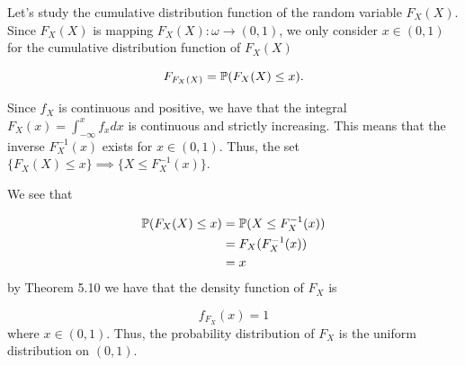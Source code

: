 
Let's study the cumulative distribution function of the random variable $ F_{X} (X)$. Since $
F_{X}(X)
$ is mapping $ F_{X} (X): \omega \to (0,1)$, we only consider $ x \in (0,1)$ for the cumulative
distribution function of $ F_{X} (X)$

\[
    F_{F_{X}(X) } = \P( F_{X} (X) \leq x) 
.\] 

Since $ f_{X} $ is continuous and positive, we have that the integral $ F_{X}(x) =
\int_{-\infty}^{x} f_{x}dx$ is continuous and strictly increasing. This means that the inverse $
F_{X}^{-1}(x)  $ exists for $ x \in (0,1)$. Thus, the set $ \{ F_{X} (X) \leq x  \} \implies \{ X
\leq F_{X}^{-1}(x)  \} $. 

We see that 

\begin{align*}
    \P(F_{X} (X) \leq x) &= \P(X \leq F_{X}^{-1}(x))\\
			 &= F_{X} (F_{X}^{-1}(x)  )\\
			 &= x
\end{align*}
by Theorem 5.10 we have that the density function of $ F_{X} $ is 

\[
    f_{F_{X} }(x) = 1 
\] 
where $ x \in (0,1)$.
Thus, the probability distribution of $ F_{X} $ is the uniform distribution on $ (0,1)$.
